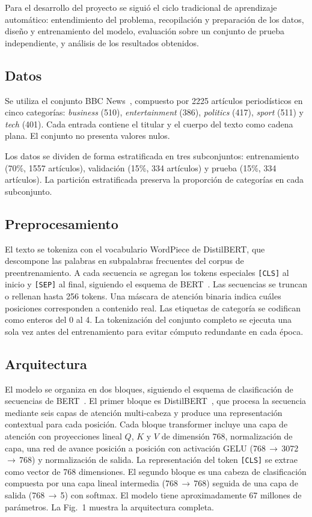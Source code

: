 \documentclass[letterpaper, 10 pt, conference]{latex_template/ieeeconf}
\begin{document}
Para el desarrollo del proyecto se siguió el ciclo tradicional de aprendizaje automático: entendimiento del problema, recopilación y preparación de los datos, diseño y entrenamiento del modelo, evaluación sobre un conjunto de prueba independiente, y análisis de los resultados obtenidos.

\subsection{Datos}

Se utiliza el conjunto BBC News~\cite{c4}, compuesto por 2225 artículos periodísticos en cinco categorías: \textit{business} (510), \textit{entertainment} (386), \textit{politics} (417), \textit{sport} (511) y \textit{tech} (401). Cada entrada contiene el titular y el cuerpo del texto como cadena plana. El conjunto no presenta valores nulos.

Los datos se dividen de forma estratificada en tres subconjuntos: entrenamiento (70\%, 1557 artículos), validación (15\%, 334 artículos) y prueba (15\%, 334 artículos). La partición estratificada preserva la proporción de categorías en cada subconjunto.

\subsection{Preprocesamiento}

El texto se tokeniza con el vocabulario WordPiece de DistilBERT, que descompone las palabras en subpalabras frecuentes del corpus de preentrenamiento. A cada secuencia se agregan los tokens especiales \texttt{[CLS]} al inicio y \texttt{[SEP]} al final, siguiendo el esquema de BERT~\cite{c2}. Las secuencias se truncan o rellenan hasta 256 tokens. Una máscara de atención binaria indica cuáles posiciones corresponden a contenido real. Las etiquetas de categoría se codifican como enteros del 0 al 4. La tokenización del conjunto completo se ejecuta una sola vez antes del entrenamiento para evitar cómputo redundante en cada época.

\subsection{Arquitectura}

El modelo se organiza en dos bloques, siguiendo el esquema de clasificación de secuencias de BERT~\cite{c2}. El primer bloque es DistilBERT~\cite{c5}, que procesa la secuencia mediante seis capas de atención multi-cabeza y produce una representación contextual para cada posición. Cada bloque transformer incluye una capa de atención con proyecciones lineal $Q$, $K$ y $V$ de dimensión 768, normalización de capa, una red de avance posición a posición con activación GELU (768\,$\to$\,3072\,$\to$\,768) y normalización de salida. La representación del token \texttt{[CLS]} se extrae como vector de 768 dimensiones. El segundo bloque es una cabeza de clasificación compuesta por una capa lineal intermedia (768\,$\to$\,768) seguida de una capa de salida (768\,$\to$\,5) con softmax. El modelo tiene aproximadamente 67 millones de parámetros. La Fig.~1 muestra la arquitectura completa.
\end{document}
